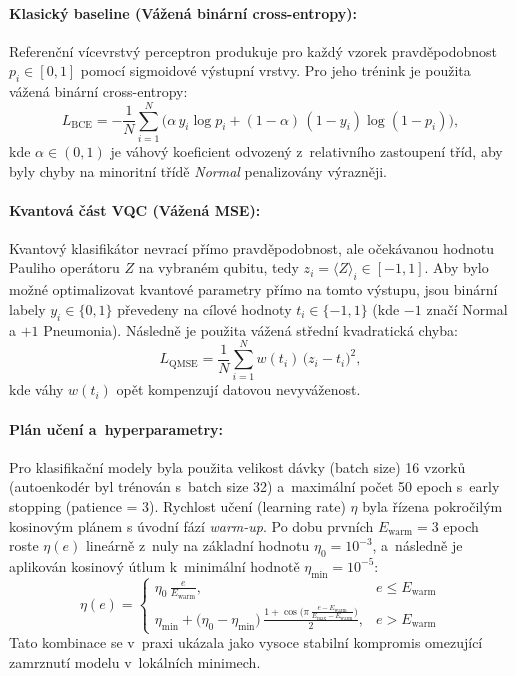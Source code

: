 \documentclass[12pt, a4paper]{report}
\begin{document}
\paragraph{Klasický baseline (Vážená binární cross-entropy):}
Referenční vícevrstvý perceptron produkuje pro každý vzorek pravděpodobnost $p_i \in [0,1]$ pomocí sigmoidové výstupní vrstvy. Pro jeho trénink je použita vážená binární cross-entropy:
\begin{equation}
    L_{\mathrm{BCE}} = - \frac{1}{N} \sum_{i=1}^{N} \bigl( \alpha\, y_i \log p_i + (1-\alpha)\,(1-y_i)\log(1-p_i) \bigr),
\end{equation}
kde $\alpha \in (0,1)$ je váhový koeficient odvozený z~relativního zastoupení tříd, aby byly chyby na minoritní třídě \textit{Normal} penalizovány výrazněji.

\paragraph{Kvantová část VQC (Vážená MSE):}
Kvantový klasifikátor nevrací přímo pravděpodobnost, ale očekávanou hodnotu Pauliho operátoru $Z$ na vybraném qubitu, tedy $z_i = \langle Z \rangle_i \in [-1,1]$. Aby bylo možné optimalizovat kvantové parametry přímo na tomto výstupu, jsou binární labely $y_i \in \{0,1\}$ převedeny na cílové hodnoty $t_i \in \{-1, 1\}$ (kde $-1$ značí Normal a $+1$ Pneumonia). Následně je použita vážená střední kvadratická chyba:
\begin{equation}
    L_{\mathrm{QMSE}} = \frac{1}{N} \sum_{i=1}^{N} w(t_i)\,\bigl(z_i - t_i\bigr)^2,
\end{equation}
kde váhy $w(t_i)$ opět kompenzují datovou nevyváženost.

\paragraph{Plán učení a~hyperparametry:}
Pro klasifikační modely byla použita velikost dávky (batch size) 16 vzorků (autoenkodér byl trénován s~batch size 32) a~maximální počet 50 epoch s~early stopping (patience = 3). Rychlost učení (learning rate) $\eta$ byla řízena pokročilým kosinovým plánem s úvodní fází \textit{warm-up}. Po dobu prvních $E_{\mathrm{warm}} = 3$ epoch roste $\eta(e)$ lineárně z~nuly na základní hodnotu $\eta_0 = 10^{-3}$, a~následně je aplikován kosinový útlum k~minimální hodnotě $\eta_{\min} = 10^{-5}$:
\begin{equation}
  \eta(e) =
  \begin{cases}
    \eta_0 \,\frac{e}{E_{\mathrm{warm}}}, & e \leq E_{\mathrm{warm}} \\[1.0em]
    \eta_{\min} + \bigl(\eta_0 - \eta_{\min}\bigr)\, \frac{1 + \cos\!\bigl(\pi\,\tfrac{e-E_{\mathrm{warm}}}{E_{\mathrm{max}}-E_{\mathrm{warm}}}\bigr)}{2}, & e > E_{\mathrm{warm}}
  \end{cases}
\end{equation}
Tato kombinace se v~praxi ukázala jako vysoce stabilní kompromis omezující zamrznutí modelu v~lokálních minimech.
\end{document}
